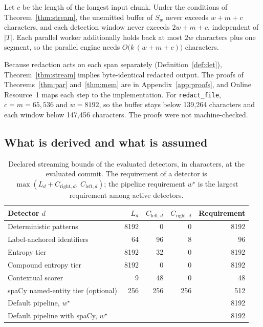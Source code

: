 \begin{theorem}\label{thm:mem}
Let $c$ be the length of the longest input chunk. Under the conditions of Theorem~\ref{thm:stream}, the unemitted buffer of $S_w$ never exceeds $w + m + c$ characters, and each detection window never exceeds $2w + m + c$, independent of $|T|$. Each parallel worker additionally holds back at most $2w$ characters plus one segment, so the parallel engine needs $O\bigl(k\,(w + m + c)\bigr)$ characters.
\end{theorem}

Because redaction acts on each span separately (Definition~\ref{def:det}), Theorem~\ref{thm:stream} implies byte-identical redacted output. The proofs of Theorems~\ref{thm:par} and~\ref{thm:mem} are in Appendix~\ref{app:proofs}, and Online Resource~1 maps each step to the implementation. For \texttt{redact\_file}, $c = m = 65{,}536$ and $w = 8192$, so the buffer stays below 139,264 characters and each window below 147,456 characters. The proofs were not machine-checked.

\subsection{What is derived and what is assumed}\label{sec:derived}

\begin{table}[t]
\caption{Declared streaming bounds of the evaluated detectors, in characters, at the evaluated commit. The requirement of a detector is $\max(L_d + C_{\mathrm{right},d},\, C_{\mathrm{left},d})$; the pipeline requirement $w^{\star}$ is the largest requirement among active detectors.}\label{tab:bounds}
\footnotesize
\begin{tabular*}{\textwidth}{@{\extracolsep\fill}lrrrr}
\toprule
Detector $d$ & $L_d$ & $C_{\mathrm{left},d}$ & $C_{\mathrm{right},d}$ & Requirement \\
\midrule
Deterministic patterns & 8192 & 0 & 0 & 8192 \\
Label-anchored identifiers & 64 & 96 & 8 & 96 \\
Entropy tier & 8192 & 32 & 0 & 8192 \\
Compound entropy tier & 8192 & 0 & 0 & 8192 \\
Contextual scorer & 9 & 48 & 0 & 48 \\
spaCy named-entity tier (optional) & 256 & 256 & 256 & 512 \\
\midrule
Default pipeline, $w^{\star}$ & & & & 8192 \\
Default pipeline with spaCy, $w^{\star}$ & & & & 8192 \\
\bottomrule
\end{tabular*}
\end{table}

